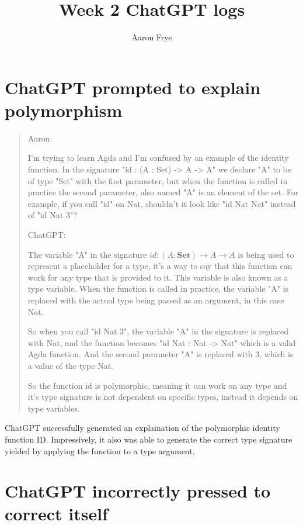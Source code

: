 \documentclass{article}
\author{Aaron Frye}
\title{Week 2 ChatGPT logs}
\newcommand{\bset}{\mathbf{Set}}
\begin{document}
\section{ChatGPT prompted to explain polymorphism}

\begin{quote}
    Aaron:

    I'm trying to learn Agda and I'm confused by an example of the identity function. In the signature "id : (A : Set) -> A -> A" we declare "A" to be of type "Set" with the first parameter, but when the function is called in practice the second parameter, also named "A" is an element of the set. For example, if you call "id" on Nat, shouldn't it look like "id Nat Nat" instead of "id Nat 3"?

    ChatGPT:
    
    The variable "A" in the signature $id : (A : \bset) \to A \to A$ is being used to represent a placeholder for a type, it's a way to say that this function can work for any type that is provided to it. This variable is also known as a type variable. When the function is called in practice, the variable "A" is replaced with the actual type being passed as an argument, in this case Nat.

    So when you call "id Nat 3", the variable "A" in the signature is replaced with Nat, and the function becomes "id Nat : Nat -> Nat" which is a valid Agda function. And the second parameter "A" is replaced with 3, which is a value of the type Nat.
    
    So the function id is polymorphic, meaning it can work on any type and it's type signature is not dependent on specific types, instead it depends on type variables.
\end{quote}

ChatGPT successfully generated an explaination of the polymorphic identity function ID. Impressively, 
it also was able to generate the correct type signature yielded by applying the function to a type argument.

\section{ChatGPT incorrectly pressed to correct itself}
\end{document}
